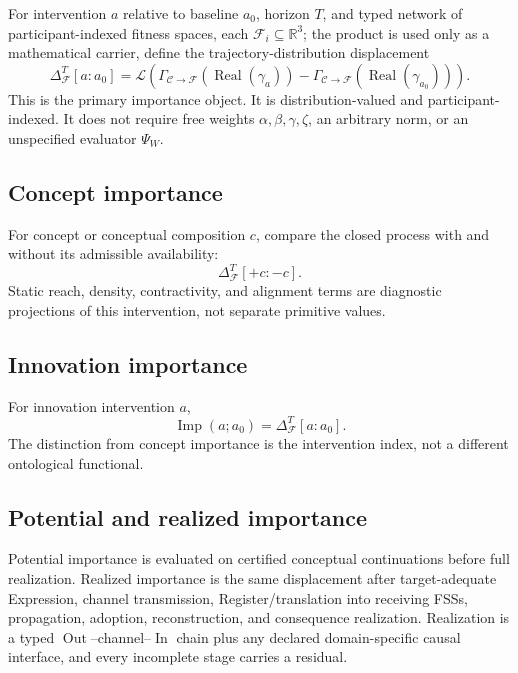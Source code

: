 \documentclass[11pt]{article}
\newcommand{\C}{\mathcal{C}}
\newcommand{\F}{\mathcal{F}}
\newcommand{\Real}{\operatorname{Real}}
\newcommand{\Imp}{\operatorname{Imp}}
\newcommand{\InOp}{\operatorname{In}}
\newcommand{\OutOp}{\operatorname{Out}}
\begin{document}
For intervention $a$ relative to baseline $a_0$, horizon $T$, and typed network of participant-indexed fitness spaces, each $\F_i\subseteq\mathbb R^3$; the product is used only as a mathematical carrier, define the trajectory-distribution displacement
\begin{equation}
\Delta_{\F}^{T}[a:a_0]
=
\mathcal L\!\left(
\Gamma_{\C\rightarrow\F}(\Real(\gamma_a))-
\Gamma_{\C\rightarrow\F}(\Real(\gamma_{a_0}))
\right).
\end{equation}
This is the primary importance object. It is distribution-valued and participant-indexed. It does not require free
weights $\alpha,\beta,\gamma,\zeta$, an arbitrary norm, or an unspecified evaluator $\Psi_W$.

\subsection{Concept importance}

For concept or conceptual composition $c$, compare the closed process with and without its admissible availability:
\begin{equation}
\Delta_{\F}^{T}[+c:-c].
\end{equation}
Static reach, density, contractivity, and alignment terms are diagnostic projections of this intervention, not separate
primitive values.

\subsection{Innovation importance}

For innovation intervention $a$,
\begin{equation}
\Imp(a;a_0)=\Delta_{\F}^{T}[a:a_0].
\end{equation}
The distinction from concept importance is the intervention index, not a different ontological functional.

\subsection{Potential and realized importance}

Potential importance is evaluated on certified conceptual continuations before full realization. Realized importance is the same displacement after target-adequate Expression, channel transmission, Register/translation into receiving FSSs, propagation, adoption, reconstruction, and consequence realization. Realization is a typed $\OutOp$--channel--$\InOp$ chain plus any declared domain-specific causal interface, and every incomplete stage carries a residual.
\end{document}
